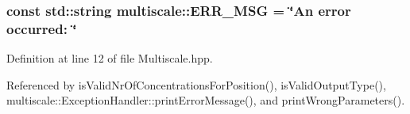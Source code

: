 \hypertarget{namespacemultiscale_a06490e4e11ef359aa0260f96579ce584}{
\subsubsection[{E\-R\-R\-\_\-\-M\-S\-G}]{\setlength{\rightskip}{0pt plus 5cm}const std\-::string multiscale\-::\-E\-R\-R\-\_\-\-M\-S\-G = \char`\"{}An error occurred\-: \char`\"{}}}\label{namespacemultiscale_a06490e4e11ef359aa0260f96579ce584}


Definition at line 12 of file Multiscale.\-hpp.



Referenced by is\-Valid\-Nr\-Of\-Concentrations\-For\-Position(), is\-Valid\-Output\-Type(), multiscale\-::\-Exception\-Handler\-::print\-Error\-Message(), and print\-Wrong\-Parameters().

